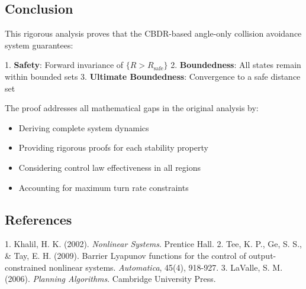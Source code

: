 \documentclass[11pt,a4paper]{article}
\numberwithin{equation}{section}
\begin{document}
\subsection{Conclusion}

This rigorous analysis proves that the CBDR-based angle-only collision avoidance system guarantees:

1. \textbf{Safety}: Forward invariance of $\{R > R_{\text{safe}}\}$
2. \textbf{Boundedness}: All states remain within bounded sets
3. \textbf{Ultimate Boundedness}: Convergence to a safe distance set

The proof addresses all mathematical gaps in the original analysis by:
\begin{itemize}
\item Deriving complete system dynamics
\item Providing rigorous proofs for each stability property
\item Considering control law effectiveness in all regions
\item Accounting for maximum turn rate constraints
\end{itemize}

\subsection{References}
1. Khalil, H. K. (2002). \textit{Nonlinear Systems}. Prentice Hall.
2. Tee, K. P., Ge, S. S., \& Tay, E. H. (2009). Barrier Lyapunov functions for the control of output-constrained nonlinear systems. \textit{Automatica}, 45(4), 918-927.
3. LaValle, S. M. (2006). \textit{Planning Algorithms}. Cambridge University Press.
\end{document}
